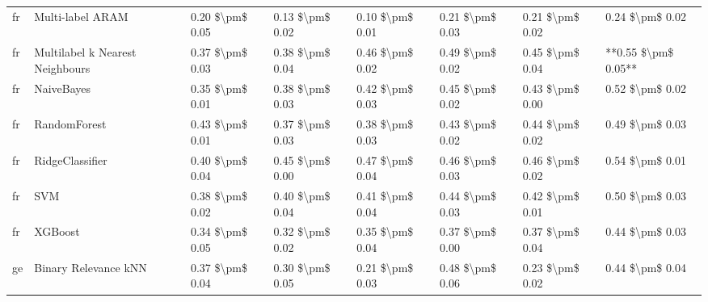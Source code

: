 \begin{tabular}{llllllll}
      fr &                Multi-label ARAM & 0.20 \$\textbackslash pm\$ 0.05 &           0.13 \$\textbackslash pm\$ 0.02 &       0.10 \$\textbackslash pm\$ 0.01 &        0.21 \$\textbackslash pm\$ 0.03 &                         0.21 \$\textbackslash pm\$ 0.02 &     0.24 \$\textbackslash pm\$ 0.02 \\
      fr & Multilabel k Nearest Neighbours & 0.37 \$\textbackslash pm\$ 0.03 &           0.38 \$\textbackslash pm\$ 0.04 &       0.46 \$\textbackslash pm\$ 0.02 &        0.49 \$\textbackslash pm\$ 0.02 &                         0.45 \$\textbackslash pm\$ 0.04 & **0.55 \$\textbackslash pm\$ 0.05** \\
      fr &                      NaiveBayes & 0.35 \$\textbackslash pm\$ 0.01 &           0.38 \$\textbackslash pm\$ 0.03 &       0.42 \$\textbackslash pm\$ 0.03 &        0.45 \$\textbackslash pm\$ 0.02 &                         0.43 \$\textbackslash pm\$ 0.00 &     0.52 \$\textbackslash pm\$ 0.02 \\
      fr &                    RandomForest & 0.43 \$\textbackslash pm\$ 0.01 &           0.37 \$\textbackslash pm\$ 0.03 &       0.38 \$\textbackslash pm\$ 0.03 &        0.43 \$\textbackslash pm\$ 0.02 &                         0.44 \$\textbackslash pm\$ 0.02 &     0.49 \$\textbackslash pm\$ 0.03 \\
      fr &                 RidgeClassifier & 0.40 \$\textbackslash pm\$ 0.04 &           0.45 \$\textbackslash pm\$ 0.00 &       0.47 \$\textbackslash pm\$ 0.04 &        0.46 \$\textbackslash pm\$ 0.03 &                         0.46 \$\textbackslash pm\$ 0.02 &     0.54 \$\textbackslash pm\$ 0.01 \\
      fr &                             SVM & 0.38 \$\textbackslash pm\$ 0.02 &           0.40 \$\textbackslash pm\$ 0.04 &       0.41 \$\textbackslash pm\$ 0.04 &        0.44 \$\textbackslash pm\$ 0.03 &                         0.42 \$\textbackslash pm\$ 0.01 &     0.50 \$\textbackslash pm\$ 0.03 \\
      fr &                         XGBoost & 0.34 \$\textbackslash pm\$ 0.05 &           0.32 \$\textbackslash pm\$ 0.02 &       0.35 \$\textbackslash pm\$ 0.04 &        0.37 \$\textbackslash pm\$ 0.00 &                         0.37 \$\textbackslash pm\$ 0.04 &     0.44 \$\textbackslash pm\$ 0.03 \\
      ge &            Binary Relevance kNN & 0.37 \$\textbackslash pm\$ 0.04 &           0.30 \$\textbackslash pm\$ 0.05 &       0.21 \$\textbackslash pm\$ 0.03 &        0.48 \$\textbackslash pm\$ 0.06 &                         0.23 \$\textbackslash pm\$ 0.02 &     0.44 \$\textbackslash pm\$ 0.04 \\

\end{tabular}
